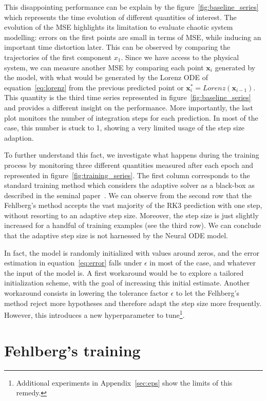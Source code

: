 \documentclass{article}
\newcommand{\x}{\ensuremath{\mathbf{x}}} %
\newcommand{\eps}{\ensuremath{\epsilon}}
\begin{document}
This disappointing performance can be explain by the
figure~\ref{fig:baseline_series} which represents the time evolution
of different quantities of interest. The evolution of the MSE
highlights its limitation to evaluate chaotic system modelling:
errors on the first points are small in terms of MSE, while 
inducing an important time distortion later. This can be observed by comparing the
trajectories of the first component $x_1$. Since we have access to the
physical system, we can measure another MSE by comparing each point
$\x_i$ generated by the model, with what would be generated by the
Lorenz ODE of equation~\ref{eq:lorenz} from the previous predicted
point or $\x_i^*=Lorenz(\x_{i-1})$. This quantity is the third time
series represented in figure~\ref{fig:baseline_series} and provides a
different insight on the performance.  More importantly, the last plot
monitors the number of integration steps for each prediction. In most
of the case, this number is stuck to 1, showing a very limited usage
of the step size adaption.


To further understand this fact, we investigate what happens during
the training process by monitoring three different quantities measured
after each epoch and represented in figure~\ref{fig:training_series}. 
The first column corresponds to the standard training method which
considers the adaptive solver as a black-box as described in the
seminal paper~\cite{Chen18NODE}. We can observe from the second row
that the Fehlberg's method accepts the vast majority of the RK3
prediction with one step, without resorting to an adaptive step
size. Moreover, the step size is just slightly increased for a handful
of training examples (see the third row). We can conclude that the
adaptive step size is not harnessed by the Neural ODE model.

In fact, the model is randomly initialized with values around zeros,
and the error estimation in equation~\ref{eq:error} falls under $\eps$
in most of the case, and whatever the input of the model is. A first
workaround would be to explore a tailored initialization scheme, with
the goal of increasing this initial estimate. Another workaround
consists in lowering the tolerance factor $\eps$ to let the Felhberg's
method reject more hypotheses and therefore adapt the step size more
frequently.  However, this introduces a new hyperparameter to
tune\footnote{Additional experiments in Appendix~\ref{sec:eps} show
  the limits of this remedy.}.

\section{Fehlberg's training }
\label{sec:fehlberg-training}
\end{document}
